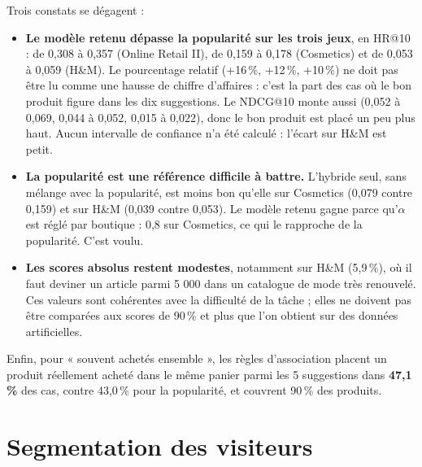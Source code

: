 Trois constats se dégagent :
\begin{itemize}
  \item \textbf{Le modèle retenu dépasse la popularité sur les trois jeux}, en HR@10 : de 0,308 à 0,357 (Online Retail II), de 0,159 à 0,178 (Cosmetics) et de 0,053 à 0,059 (H\&M). Le pourcentage relatif (+16\,\%, +12\,\%, +10\,\%) ne doit pas être lu comme une hausse de chiffre d'affaires : c'est la part des cas où le bon produit figure dans les dix suggestions. Le NDCG@10 monte aussi (0,052 à 0,069, 0,044 à 0,052, 0,015 à 0,022), donc le bon produit est placé un peu plus haut. Aucun intervalle de confiance n'a été calculé : l'écart sur H\&M est petit.
  \item \textbf{La popularité est une référence difficile à battre.} L'hybride seul, sans mélange avec la popularité, est moins bon qu'elle sur Cosmetics (0,079 contre 0,159) et sur H\&M (0,039 contre 0,053). Le modèle retenu gagne parce qu'$\alpha$ est réglé par boutique : 0,8 sur Cosmetics, ce qui le rapproche de la popularité. C'est voulu.
  \item \textbf{Les scores absolus restent modestes}, notamment sur H\&M (5,9\,\%), où il faut deviner un article parmi 5 000 dans un catalogue de mode très renouvelé. Ces valeurs sont cohérentes avec la difficulté de la tâche ; elles ne doivent pas être comparées aux scores de 90\,\% et plus que l'on obtient sur des données artificielles.
\end{itemize}
Enfin, pour « souvent achetés ensemble », les règles d'association placent un produit réellement acheté dans le même panier parmi les 5 suggestions dans \textbf{47,1\,\%} des cas, contre 43,0\,\% pour la popularité, et couvrent 90\,\% des produits.

\section{Segmentation des visiteurs}
